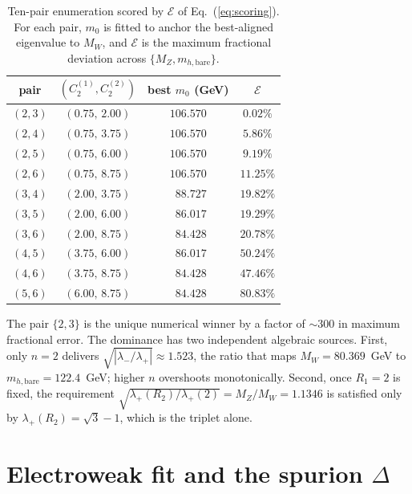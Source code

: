 \documentclass[%
 aps,
 prd,
 reprint,
 nofootinbib,
 superscriptaddress,
 amsmath,
 amssymb,
]{revtex4-2}
\begin{document}
\begin{table}[t]
\caption{Ten-pair enumeration scored by $\mathcal{E}$ of Eq.~(\ref{eq:scoring}). For each pair, $m_0$ is fitted to anchor the best-aligned eigenvalue to $M_W$, and $\mathcal{E}$ is the maximum fractional deviation across $\{M_Z, m_{h,\mathrm{bare}}\}$.}
\label{tab:pairs}
\begin{ruledtabular}
\begin{tabular}{cccc}
pair & $(C_2^{(1)},C_2^{(2)})$ & best $m_0$ (GeV) & $\mathcal{E}$ \\
\hline
$(2,3)$ & $(0.75,\,2.00)$ & $106.570$ & $\mathbf{0.02\%}$ \\
$(2,4)$ & $(0.75,\,3.75)$ & $106.570$ & $5.86\%$ \\
$(2,5)$ & $(0.75,\,6.00)$ & $106.570$ & $9.19\%$ \\
$(2,6)$ & $(0.75,\,8.75)$ & $106.570$ & $11.25\%$ \\
$(3,4)$ & $(2.00,\,3.75)$ & $\phantom{0}88.727$ & $19.82\%$ \\
$(3,5)$ & $(2.00,\,6.00)$ & $\phantom{0}86.017$ & $19.29\%$ \\
$(3,6)$ & $(2.00,\,8.75)$ & $\phantom{0}84.428$ & $20.78\%$ \\
$(4,5)$ & $(3.75,\,6.00)$ & $\phantom{0}86.017$ & $50.24\%$ \\
$(4,6)$ & $(3.75,\,8.75)$ & $\phantom{0}84.428$ & $47.46\%$ \\
$(5,6)$ & $(6.00,\,8.75)$ & $\phantom{0}84.428$ & $80.83\%$ \\
\end{tabular}
\end{ruledtabular}
\end{table}

The pair $\{2,3\}$ is the unique numerical winner by a factor of $\sim 300$ in maximum fractional error. The dominance has two independent algebraic sources. First, only $n=2$ delivers $\sqrt{|\lambda_-/\lambda_+|}\approx 1.523$, the ratio that maps $M_W=80.369$~GeV to $m_{h,\mathrm{bare}}=122.4$~GeV; higher $n$ overshoots monotonically. Second, once $R_1=2$ is fixed, the requirement $\sqrt{\lambda_+(R_2)/\lambda_+(2)}=M_Z/M_W=1.1346$ is satisfied only by $\lambda_+(R_2)=\sqrt{3}-1$, which is the triplet alone.

\section{Electroweak fit and the spurion $\Delta$}\label{sec:ewfit}
\end{document}
